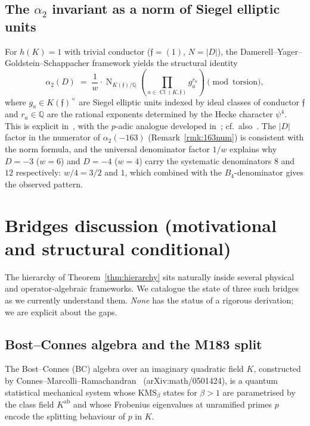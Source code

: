 \documentclass[12pt]{amsart}
\theoremstyle{definition}
\DeclareMathOperator{\Nm}{N}
\DeclareMathOperator{\Cl}{Cl}
\newcommand{\Q}{\mathbb{Q}}
\newcommand{\ff}{\mathfrak{f}}
\begin{document}
\subsection{The $\alpha_2$ invariant as a norm of Siegel elliptic units}

For $h(K) = 1$ with trivial conductor ($\ff = (1)$, $N = |D|$), the
Damerell--Yager--Goldstein--Schappacher framework yields the
structural identity
\begin{equation}\label{eq:siegel}
  \alpha_2(D) \;=\; \frac{1}{w} \cdot
    \Nm_{K(\ff)/\Q}\!\left( \prod_{a \in \Cl(K, \ff)} g_a^{r_a} \right)
    \pmod{\text{torsion}},
\end{equation}
where $g_a \in K(\ff)^\times$ are Siegel elliptic units indexed by
ideal classes of conductor $\ff$ and $r_a \in \Q$ are the rational
exponents determined by the Hecke character $\psi^4$. This is
explicit in~\cite{GoldsteinSchappacher1981}, with the $p$-adic
analogue developed in~\cite{Kriz2018}; cf.\
also~\cite{CITE-NEEDED-Katz1978}. The $|D|$ factor in the numerator
of $\alpha_2(-163)$ (Remark~\ref{rmk:163num}) is consistent with the
norm formula, and the universal denominator factor $1/w$ explains
why $D = -3$ ($w = 6$) and $D = -4$ ($w = 4$) carry the systematic
denominators $8$ and $12$ respectively: $w/4 = 3/2$ and $1$, which
combined with the $B_4$-denominator gives the observed pattern.

\section{Bridges discussion (motivational and structural conditional)}
\label{sec:bridges}

The hierarchy of Theorem~\ref{thm:hierarchy} sits naturally inside
several physical and operator-algebraic frameworks. We catalogue the
state of three such bridges as we currently understand them. \emph{None}
has the status of a rigorous derivation; we are explicit about the
gaps.

\subsection{Bost--Connes algebra and the M183 split}

The Bost--Connes (BC) algebra over an imaginary quadratic field $K$,
constructed by Connes--Marcolli--Ramachandran~\cite{ConnesMarcolliRamachandran2005}
(arXiv:math/0501424), is a quantum statistical mechanical system
whose KMS$_\beta$ states for $\beta > 1$ are parametrised by the
class field $K^{\mathrm{ab}}$ and whose Frobenius eigenvalues at
unramified primes $p$ encode the splitting behaviour of $p$ in $K$.
\end{document}
